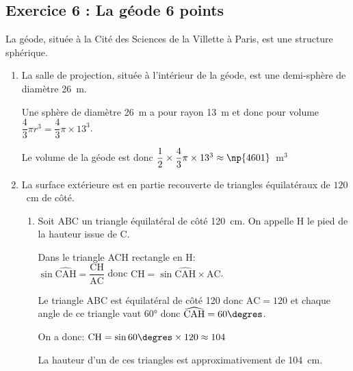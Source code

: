 \documentclass[10pt]{article}
\begin{document}
\vspace{0,5cm}

\subsection*{Exercice 6 : La géode \hfill 6 points}

\medskip

La géode, située à la Cité des Sciences de la Villette à Paris, est une
structure sphérique.

\medskip

\begin{enumerate}
\item La salle de projection, située à l'intérieur de la géode, est une
demi-sphère de diamètre 26~m.

Une sphère de diamètre 26~m a pour rayon 13~m et donc pour volume
$\dfrac{4}{3}\pi r^3 = \dfrac{4}{3}\pi\times 13^3$.

Le volume de la géode est donc 
$\dfrac{1}{2}\times \dfrac{4}{3}\pi \times 13^3 \approx \np{4601}$~m$^3$


\item La surface extérieure est en partie recouverte de triangles équilatéraux de $120$~cm de côté.

	\begin{enumerate}

		\item%

\begin{multicols}{2}

Soit ABC un triangle équilatéral de côté 120~cm. On appelle H le pied de la hauteur issue de C.

Dans le triangle ACH rectangle en H:\\ $\sin \widehat{\text{CAH}} = \dfrac{\text{CH}}{\text{AC}}$ donc $\text{CH}= \sin \widehat{\text{CAH}}\times \text{AC}$.

Le triangle ABC est équilatéral de côté 120 donc $\text{AC}=120$ et chaque angle de ce triangle vaut 60° donc $\widehat{\text{CAH}}=60\degres$.

On a donc: 
$\text{CH}= \sin 60\degres\times 120 \approx 104$

La hauteur d'un de ces triangles est approximativement de 104~cm.

\columnbreak


\end{multicols}
\end{enumerate}
\end{enumerate}
\end{document}
